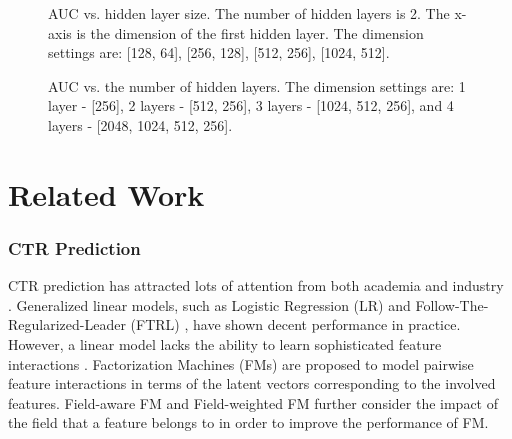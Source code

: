 \documentclass{article}
\begin{document}
\begin{figure}[!t]
\centering
{}
\vskip -8pt
\caption{AUC vs. hidden layer size. The number of hidden layers is 2. The x-axis is the dimension of the first hidden layer. The dimension settings are: [128, 64], [256, 128], [512, 256], [1024, 512].}
\vskip -10pt
\label{layer_size}
\end{figure}

\begin{figure}[!t]
\centering
{}
\vskip -8pt
\caption{AUC vs. the number of hidden layers. The dimension settings are: 1 layer - [256], 2 layers - [512, 256], 3 layers - [1024, 512, 256], and 4 layers - [2048, 1024, 512, 256].}
\vskip -10pt
\label{layer_depth}
\end{figure}

\section{Related Work}
\subsubsection{CTR Prediction}
CTR prediction has attracted lots of attention from both academia and industry \cite{he2014practical,cheng2016wide,he2017neural,zhou2018deep}.
Generalized linear models, such as Logistic Regression (LR) \cite{richardson2007predicting} and Follow-The-Regularized-Leader (FTRL) \cite{mcmahan2013ad}, have shown decent performance in practice. However, a linear model lacks the ability to learn sophisticated feature interactions \cite{chapelle2015simple}. Factorization Machines (FMs) \cite{rendle2010factorization,rendle2012factorization} are proposed to model pairwise feature interactions in terms of the latent vectors corresponding to the involved features. Field-aware FM \cite{juan2016field} and Field-weighted FM \cite{pan2018field} further consider the impact of the field that a feature belongs to in order to improve the performance of FM.
\end{document}
